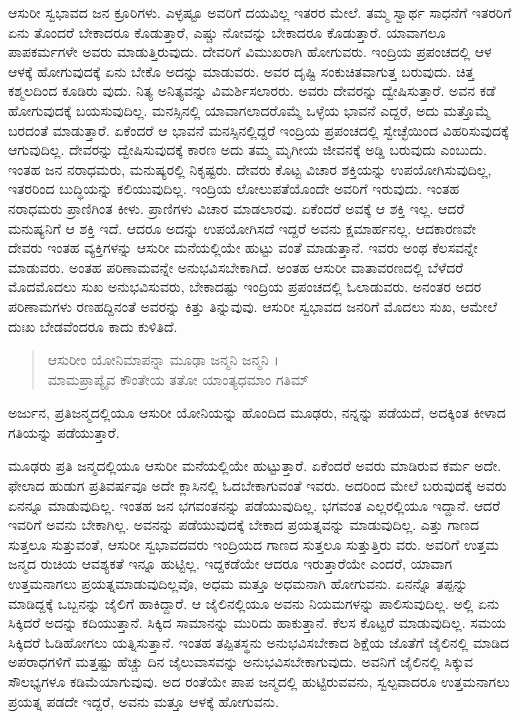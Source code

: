 ಆಸುರೀ ಸ್ವಭಾವದ ಜನ ಕ್ರೂರಿಗಳು. ಎಳ್ಳಷ್ಟೂ ಅವರಿಗೆ ದಯವಿಲ್ಲ ಇತರರ ಮೇಲೆ. ತಮ್ಮ ಸ್ವಾರ್ಥ ಸಾಧನೆಗೆ ಇತರರಿಗೆ ಏನು ತೊಂದರೆ ಬೇಕಾದರೂ ಕೊಡುತ್ತಾರೆ, ಎಷ್ಚು ನೋವನ್ನು ಬೇಕಾದರೂ ಕೊಡುತ್ತಾರೆ. ಯಾವಾಗಲೂ ಪಾಪಕರ್ಮಗಳೇ ಅವರು ಮಾಡುತ್ತಿರುವುದು. ದೇವರಿಗೆ ವಿಮುಖರಾಗಿ ಹೋಗುವರು. ಇಂದ್ರಿಯ ಪ್ರಪಂಚದಲ್ಲಿ ಆಳ ಆಳಕ್ಕೆ ಹೋಗುವುದಕ್ಕೆ ಏನು ಬೇಕೊ ಅದನ್ನು ಮಾಡುವರು. ಅವರ ದೃಷ್ಟಿ ಸಂಕುಚಿತವಾಗುತ್ತ ಬರುವುದು. ಚಿತ್ತ ಕಶ್ಮಲದಿಂದ ಕೂಡಿರು ವುದು. ನಿತ್ಯ ಅನಿತ್ಯವನ್ನು ವಿಮರ್ಶಿಸಲಾರರು. ಅವರು ದೇವರನ್ನು ದ್ವೇಷಿಸುತ್ತಾರೆ. ಅವನ ಕಡೆ ಹೋಗುವುದಕ್ಕೆ ಬಯಸುವುದಿಲ್ಲ. ಮನಸ್ಸಿನಲ್ಲಿ ಯಾವಾಗಲಾದರೊಮ್ಮೆ ಒಳ್ಳೆಯ ಭಾವನೆ ಎದ್ದರೆ, ಅದು ಮತ್ತೊಮ್ಮೆ ಬರದಂತೆ ಮಾಡುತ್ತಾರೆ. ಏಕೆಂದರೆ ಆ ಭಾವನೆ ಮನಸ್ಸಿನಲ್ಲಿದ್ದರೆ ಇಂದ್ರಿಯ ಪ್ರಪಂಚದಲ್ಲಿ ಸ್ವೇಚ್ಛೆಯಿಂದ ವಿಹರಿಸುವುದಕ್ಕೆ ಆಗುವುದಿಲ್ಲ. ದೇವರನ್ನು ದ್ವೇಷಿಸುವುದಕ್ಕೆ ಕಾರಣ ಅದು ತಮ್ಮ ಮೃಗೀಯ ಜೀವನಕ್ಕೆ ಅಡ್ಡಿ ಬರುವುದು ಎಂಬುದು. ಇಂತಹ ಜನ ನರಾಧಮರು, ಮನುಷ್ಯರಲ್ಲಿ ನಿಕೃಷ್ಟರು. ದೇವರು ಕೊಟ್ಟ ವಿಚಾರ ಶಕ್ತಿಯನ್ನು ಉಪಯೋಗಿಸುವುದಿಲ್ಲ, ಇತರರಿಂದ ಬುದ್ಧಿಯನ್ನು ಕಲಿಯುವುದಿಲ್ಲ. ಇಂದ್ರಿಯ ಲೋಲುಪತೆಯೊಂದೇ ಅವರಿಗೆ ಇರುವುದು. ಇಂತಹ ನರಾಧಮರು ಪ್ರಾಣಿಗಿಂತ ಕೀಳು. ಪ್ರಾಣಿಗಳು ವಿಚಾರ ಮಾಡಲಾರವು. ಏಕೆಂದರೆ ಅವಕ್ಕೆ ಆ ಶಕ್ತಿ ಇಲ್ಲ. ಆದರೆ ಮನುಷ್ಯನಿಗೆ ಆ ಶಕ್ತಿ ಇದೆ. ಆದರೂ ಅದನ್ನು ಉಪಯೋಗಿಸದೆ ಇದ್ದರೆ ಅವನು ಕ್ಷಮಾರ್ಹನಲ್ಲ. ಆದಕಾರಣವೇ ದೇವರು ಇಂತಹ ವ್ಯಕ್ತಿಗಳನ್ನು ಆಸುರೀ ಮನೆಯಲ್ಲಿಯೇ ಹುಟ್ಟು ವಂತೆ ಮಾಡುತ್ತಾನೆ. ಇವರು ಅಂಥ ಕೆಲಸವನ್ನೇ ಮಾಡುವರು. ಅಂತಹ ಪರಿಣಾಮವನ್ನೇ ಅನುಭವಿಸಬೇಕಾಗಿದೆ. ಅಂತಹ ಆಸುರೀ ವಾತಾವರಣದಲ್ಲಿ ಬೆಳೆದರೆ ಮೊದಮೊದಲು ಸುಖ ಅನುಭವಿಸುವರು, ಬೇಕಾದಷ್ಟು ಇಂದ್ರಿಯ ಪ್ರಪಂಚದಲ್ಲಿ ಓಲಾಡುವರು. ಅನಂತರ ಅದರ ಪರಿಣಾಮಗಳು ರಣಹದ್ದಿನಂತೆ ಅವರನ್ನು ಕಿತ್ತು ತಿನ್ನುವುವು. ಆಸುರೀ ಸ್ವಭಾವದ ಜನರಿಗೆ ಮೊದಲು ಸುಖ, ಆಮೇಲೆ ದುಃಖ ಬೇಡವೆಂದರೂ ಕಾದು ಕುಳಿತಿದೆ.

\begin{verse}
ಆಸುರೀಂ ಯೋನಿಮಾಪನ್ನಾ ಮೂಢಾ ಜನ್ಮನಿ ಜನ್ಮನಿ ।\\ಮಾಮಪ್ರಾಪ್ಯೈವ ಕೌಂತೇಯ ತತೋ ಯಾಂತ್ಯಧಮಾಂ ಗತಿಮ್ 
\end{verse}

{\small ಅರ್ಜುನ, ಪ್ರತಿಜನ್ಮದಲ್ಲಿಯೂ ಆಸುರೀ ಯೋನಿಯನ್ನು ಹೊಂದಿದ ಮೂಢರು, ನನ್ನನ್ನು ಪಡೆಯದೆ, ಅದಕ್ಕಿಂತ ಕೀಳಾದ ಗತಿಯನ್ನು ಪಡೆಯುತ್ತಾರೆ.}

ಮೂಢರು ಪ್ರತಿ ಜನ್ಮದಲ್ಲಿಯೂ ಆಸುರೀ ಮನೆಯಲ್ಲಿಯೇ ಹುಟ್ಟುತ್ತಾರೆ. ಏಕೆಂದರೆ ಅವರು ಮಾಡಿರುವ ಕರ್ಮ ಅದೇ. ಫೇಲಾದ ಹುಡುಗ ಪ್ರತಿವರ್ಷವೂ ಅದೇ ಕ್ಲಾಸಿನಲ್ಲಿ ಓದಬೇಕಾಗುವಂತೆ ಇವರು. ಅದರಿಂದ ಮೇಲೆ ಬರುವುದಕ್ಕೆ ಅವರು ಏನನ್ನೂ ಮಾಡುವುದಿಲ್ಲ. ಇಂತಹ ಜನ ಭಗವಂತನನ್ನು ಪಡೆಯುವುದಿಲ್ಲ. ಭಗವಂತ ಎಲ್ಲರಲ್ಲಿಯೂ ಇದ್ದಾನೆ. ಆದರೆ ಇವರಿಗೆ ಅವನು ಬೇಕಾಗಿಲ್ಲ. ಅವನನ್ನು ಪಡೆಯುವುದಕ್ಕೆ ಬೇಕಾದ ಪ್ರಯತ್ನವನ್ನು ಮಾಡುವುದಿಲ್ಲ. ಎತ್ತು ಗಾಣದ ಸುತ್ತಲೂ ಸುತ್ತುವಂತೆ, ಆಸುರೀ ಸ್ವಭಾವದವರು ಇಂದ್ರಿಯದ ಗಾಣದ ಸುತ್ತಲೂ ಸುತ್ತುತ್ತಿರು ವರು. ಅವರಿಗೆ ಉತ್ತಮ ಜನ್ಮದ ರುಚಿಯ ಆವಶ್ಯಕತೆ ಇನ್ನೂ ಹುಟ್ಟಿಲ್ಲ. ಇದ್ದಕಡೆಯೇ ಆದರೂ ಇರುತ್ತಾರೆಯೇ ಎಂದರೆ, ಯಾವಾಗ ಉತ್ತಮನಾಗಲು ಪ್ರಯತ್ನಮಾಡುವುದಿಲ್ಲವೊ, ಅಧಮ ಮತ್ತೂ ಅಧಮನಾಗಿ ಹೋಗುವನು. ಏನನ್ನೊ ತಪ್ಪನ್ನು ಮಾಡಿದ್ದಕ್ಕೆ ಒಬ್ಬನನ್ನು ಜೈಲಿಗೆ ಹಾಕಿದ್ದಾರೆ. ಆ ಜೈಲಿನಲ್ಲಿಯೂ ಅವನು ನಿಯಮಗಳನ್ನು ಪಾಲಿಸುವುದಿಲ್ಲ. ಅಲ್ಲಿ ಏನು ಸಿಕ್ಕಿದರೆ ಅದನ್ನು ಕದಿಯುತ್ತಾನೆ. ಸಿಕ್ಕಿದ ಸಾಮಾನನ್ನು ಮುರಿದು ಹಾಕುತ್ತಾನೆ. ಕೆಲಸ ಕೊಟ್ಟರೆ ಮಾಡುವುದಿಲ್ಲ. ಸಮಯ ಸಿಕ್ಕಿದರೆ ಓಡಿಹೋಗಲು ಯತ್ನಿಸುತ್ತಾನೆ. ಇಂತಹ ತಪ್ಪಿತಸ್ಥನು ಅನುಭವಿಸಬೇಕಾದ ಶಿಕ್ಷೆಯ ಜೊತೆಗೆ ಜೈಲಿನಲ್ಲಿ ಮಾಡಿದ ಅಪರಾಧಗಳಿಗೆ ಮತ್ತಷ್ಟು ಹೆಚ್ಚು ದಿನ ಜೈಲುವಾಸವನ್ನು ಅನುಭವಿಸಬೇಕಾಗುವುದು. ಅವನಿಗೆ ಜೈಲಿನಲ್ಲಿ ಸಿಕ್ಕುವ ಸೌಲಭ್ಯಗಳೂ ಕಡಿಮೆಯಾಗುವುವು. ಅದ ರಂತೆಯೇ ಪಾಪ ಜನ್ಮದಲ್ಲಿ ಹುಟ್ಟಿರುವವನು, ಸ್ವಲ್ಪವಾದರೂ ಉತ್ತಮನಾಗಲು ಪ್ರಯತ್ನ ಪಡದೇ ಇದ್ದರೆ, ಅವನು ಮತ್ತೂ ಆಳಕ್ಕೆ ಹೋಗುವನು.

